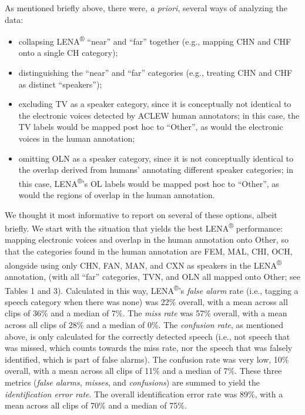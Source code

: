 \documentclass[english,table,man,floatsintext]{apa6}
\providecommand{\tightlist}{%
  \setlength{\itemsep}{0pt}\setlength{\parskip}{0pt}}
\begin{document}
As mentioned briefly above, there were, \emph{a priori}, several ways of analyzing the data:

\begin{itemize}
\tightlist
\item
  collapsing LENA\textsuperscript{®} \enquote{near} and \enquote{far} together (e.g., mapping CHN and CHF onto a single CH category);
\item
  distinguishing the \enquote{near} and \enquote{far} categories (e.g., treating CHN and CHF as distinct \enquote{speakers});
\item
  excluding TV as a speaker category, since it is conceptually not identical to the electronic voices detected by ACLEW human annotators; in this case, the TV labels would be mapped post hoc to \enquote{Other}, as would the electronic voices in the human annotation;
\item
  omitting OLN as a speaker category, since it is not conceptually identical to the overlap derived from humans' annotating different speaker categories; in this case, LENA\textsuperscript{®}'s OL labels would be mapped post hoc to \enquote{Other}, as would the regions of overlap in the human annotation.
\end{itemize}

We thought it most informative to report on several of these options, albeit briefly. We start with the situation that yields the best LENA\textsuperscript{®} performance: mapping electronic voices and overlap in the human annotation onto Other, so that the categories found in the human annotation are FEM, MAL, CHI, OCH, alongside using only CHN, FAN, MAN, and CXN as speakers in the LENA\textsuperscript{®} annotation, (with all \enquote{far} categories, TVN, and OLN all mapped onto Other; see Tables 1 and 3).
Calculated in this way, LENA\textsuperscript{®}'s \emph{false alarm} rate (i.e., tagging a speech category when there was none) was 22\% overall, with a mean across all clips of 36\% and a median of 7\%. The \emph{miss rate} was 57\% overall, with a mean across all clips of 28\% and a median of 0\%. The \emph{confusion rate}, as mentioned above, is only calculated for the correctly detected speech (i.e., not speech that was missed, which counts towards the miss rate, nor the speech that was falsely identified, which is part of false alarms). The confusion rate was very low, 10\% overall, with a mean across all clips of 11\% and a median of 7\%. These three metrics (\emph{false alarms}, \emph{misses}, and \emph{confusions}) are summed to yield the \emph{identification error rate}. The overall identification error rate was 89\%, with a mean across all clips of 70\% and a median of 75\%.
\end{document}
